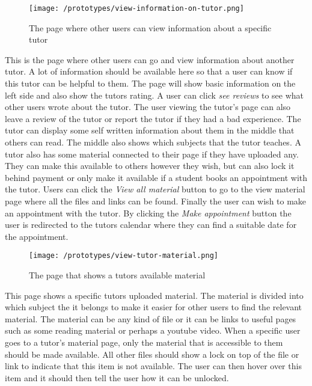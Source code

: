  \begin{figure}[H]
    \texttt{[image: /prototypes/view-information-on-tutor.png]}
     \caption{The page where other users can view information about a specific tutor}
     \label{fig:view-information-on-tutor}
 \end{figure}
This is the page where other users can go and view information about another tutor. 
A lot of information should be available here so that a user can know if this tutor can be helpful to them.
The page will show basic information on the left side and also show the tutors rating. 
A user can click \textit{see reviews} to see what other users wrote about the tutor. 
The user viewing the tutor's page can also leave a review of the tutor or report the tutor if they had a bad experience. 
The tutor can display some self written information about them in the middle that others can read. The middle also shows which subjects that the tutor teaches. 
A tutor also has some material connected to their page if they have uploaded any. 
They can make this available to others however they wish, but can also lock it behind payment or only make it available if a student books an appointment with the tutor.
Users can click the \textit{View all material} button to go to the view material page where all the files and links can be found. 
Finally the user can wish to make an appointment with the tutor. 
By clicking the \textit{Make appointment} button the user is redirected to the tutors calendar where they can find a suitable date for the appointment. 


 \begin{figure}[H]
    \texttt{[image: /prototypes/view-tutor-material.png]}
     \caption{The page that shows a tutors available material}
     \label{fig:view-tutor-material}
 \end{figure}
This page shows a specific tutors uploaded material. The material is divided into which subject the it belongs to make it easier for other users to find the relevant material. The material can be any kind of file or it can be links to useful pages such as some reading material or perhaps a youtube video. When a specific user goes to a tutor's material page, only the material that is accessible to them should be made available. All other files should show a lock on top of the file or link to indicate that this item is not available. The user can then hover over this item and it should then tell the user how it can be unlocked. 
